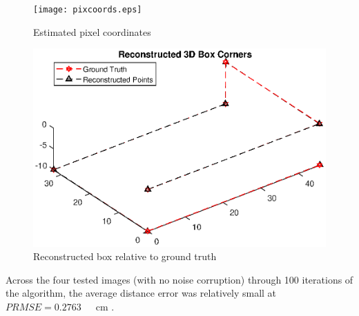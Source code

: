 \documentclass[12pt]{article}
\begin{document}
\begin{figure}[h]
	\centering %
	\captionsetup{justification=centering}
	\begin{minipage}{0.5\textwidth}
			\centering %
		\texttt{[image: pixcoords.eps]}
		\caption{Estimated pixel coordinates} \label{pixcoords} 
	\end{minipage}\hfill
	\begin{minipage}{0.5\textwidth}
		\centering %
		\includegraphics[width=1\textwidth]{pure_recon.eps}
		\caption{Reconstructed box relative to ground truth} \label{pure_recon}
	\end{minipage}
\end{figure}

\noindent Across the four tested images (with no noise corruption) through 100 iterations of the algorithm, the average distance error was relatively small at $PRMSE = 0.2763 \quad$\ cm . 
\end{document}
